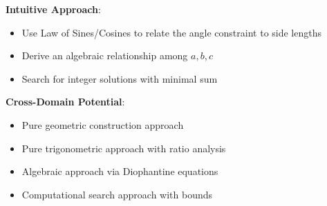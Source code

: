 \documentclass[12pt]{article}
\begin{document}
\begin{problemconfigbox}
\textbf{Intuitive Approach}: 
\begin{itemize}
    \item Use Law of Sines/Cosines to relate the angle constraint to side lengths
    \item Derive an algebraic relationship among $a, b, c$
    \item Search for integer solutions with minimal sum
\end{itemize}

\textbf{Cross-Domain Potential}:
\begin{itemize}
    \item Pure geometric construction approach
    \item Pure trigonometric approach with ratio analysis
    \item Algebraic approach via Diophantine equations
    \item Computational search approach with bounds
\end{itemize}

\end{problemconfigbox}
\end{document}
